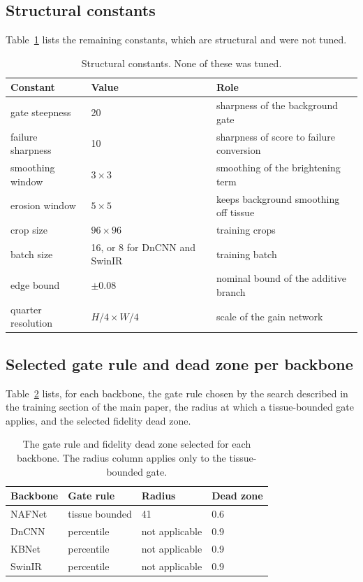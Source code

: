\subsection{Structural constants}
Table~\ref{tab:supp_constants} lists the remaining constants, which are structural and were not
tuned.

\begin{table}[t]
\centering
\caption{Structural constants. None of these was tuned.}
\label{tab:supp_constants}
\footnotesize
\begin{tabular}{p{}p{}p{}}
\toprule
Constant & Value & Role \\
\midrule
gate steepness & 20 & sharpness of the background gate \\
failure sharpness & 10 & sharpness of score to failure conversion \\
smoothing window & $3 \times 3$ & smoothing of the brightening term \\
erosion window & $5 \times 5$ & keeps background smoothing off tissue \\
crop size & $96 \times 96$ & training crops \\
batch size & 16, or 8 for DnCNN and SwinIR & training batch \\
edge bound & $\pm 0.08$ & nominal bound of the additive branch \\
quarter resolution & $H/4 \times W/4$ & scale of the gain network \\
\bottomrule
\end{tabular}
\end{table}

\subsection{Selected gate rule and dead zone per backbone}
\label{sec:supp_gate_selection}
Table~\ref{tab:supp_gate_selection} lists, for each backbone, the gate rule chosen by the search
described in the training section of the main paper, the radius at which a tissue-bounded gate
applies, and the selected fidelity dead zone.

\begin{table}[!tb]
\centering
\caption{The gate rule and fidelity dead zone selected for each backbone. The radius column applies
only to the tissue-bounded gate.}
\label{tab:supp_gate_selection}
\footnotesize
\begin{tabular}{llll}
\toprule
Backbone & Gate rule & Radius & Dead zone \\
\midrule
NAFNet & tissue bounded & 41 & 0.6 \\
DnCNN & percentile & not applicable & 0.9 \\
KBNet & percentile & not applicable & 0.9 \\
SwinIR & percentile & not applicable & 0.9 \\
\bottomrule
\end{tabular}
\end{table}

